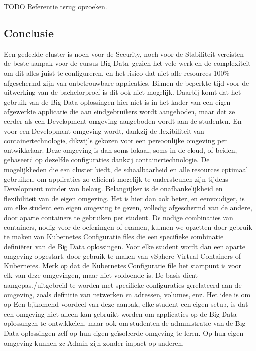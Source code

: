 TODO Referentie terug opzoeken.

\subsection{Conclusie}
Een gedeelde cluster is noch voor de Security, noch voor de Stabiliteit vereisten de beste aanpak voor de cursus Big Data, gezien het vele werk en de complexiteit om dit alles juist te configureren, en het risico dat niet alle resources 100\% afgeschermd zijn van onbetrouwbare applicaties. Binnen de beperkte tijd voor de uitwerking van de bachelorproef is dit ook niet mogelijk.
\newline
\newline
Daarbij komt dat het gebruik van de Big Data oplossingen hier niet is in het kader van een eigen afgewerkte applicatie die aan eindgebruikers wordt aangeboden, maar dat ze eerder als een Development omgeving aangeboden wordt aan de studenten. En voor een Development omgeving wordt, dankzij de flexibiliteit van containertechnologie, dikwijls gekozen voor een persoonlijke omgeving per ontwikkelaar. Deze omgeving is dan soms lokaal, soms in de cloud, of beiden, gebaseerd op dezelfde configuraties dankzij containertechnologie.
\newline
\newline
De mogelijkheden die een cluster biedt, de schaalbaarheid en alle resources optimaal gebruiken, om applicaties zo efficient mogelijk te ondersteunen zijn tijdens Development minder van belang. Belangrijker is de onafhankelijkheid en flexibiliteit van de eigen omgeving.
Het is hier dan ook beter, en eenvoudiger, is om elke student een eigen omgeving te geven, volledig afgeschermd van de andere, door aparte containers te gebruiken per student.
\newline
\newline
De nodige combinaties van containers, nodig voor de oefeningen of examen, kunnen we opzetten door gebruik te maken van Kubernetes Configuratie files die een specifieke combinatie definiëren van de Big Data oplossingen. Voor elke student wordt dan een aparte omgeving opgestart, door gebruik te maken van vSphere Virtual Containers of Kubernetes. Merk op dat de Kubernetes Configuratie file het startpunt is voor elk van deze omgevingen, maar niet voldoende is. De basis dient aangepast/uitgebreid te worden met specifieke configuraties gerelateerd aan de omgeving, zoals definitie van netwerken en adressen, volumes, enz.
\newline
\newline
Het idee is om op 
Een bijkomend voordeel van deze aanpak, elke student een eigen setup, is dat een omgeving niet alleen kan gebruikt worden om applicaties op de Big Data oplossingen te ontwikkelen, maar ook om studenten de administratie van de Big Data oplossingen zelf op hun eigen geïsoleerde omgeving te leren. Op hun eigen omgeving kunnen ze Admin zijn zonder impact op anderen.


